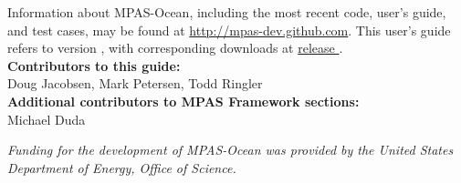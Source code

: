 Information about MPAS-Ocean, including the most recent code, user's guide, and test cases, may be found at \url{http://mpas-dev.github.com}.  This user's guide refers to version \version, with corresponding downloads at \href{http://mpas-dev.github.com/ocean/release_\version/release_\version.html}{release \version}. \\

\vspace{8pt}
\noindent
{\bf Contributors to this guide:}\\
Doug Jacobsen, Mark Petersen, Todd Ringler\\
{\bf Additional contributors to MPAS Framework sections:}\\
Michael Duda

\vspace{8pt}
\noindent
{\it Funding for the development of MPAS-Ocean was provided by the United States Department of Energy, Office of Science.}




